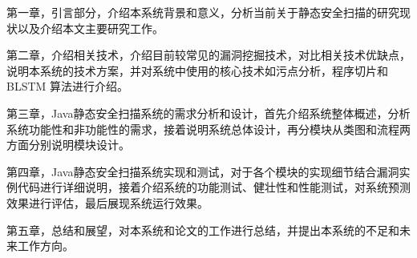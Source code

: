 第一章，引言部分，介绍本系统背景和意义，分析当前关于静态安全扫描的研究现状以及介绍本文主要研究工作。

第二章，介绍相关技术，介绍目前较常见的漏洞挖掘技术，对比相关技术优缺点，说明本系统的技术方案，并对系统中使用的核心技术如污点分析，程序切片和 BLSTM 算法进行介绍。

第三章，Java静态安全扫描系统的需求分析和设计，首先介绍系统整体概述，分析系统功能性和非功能性的需求，接着说明系统总体设计，再分模块从类图和流程两方面分别说明模块设计。

第四章，Java静态安全扫描系统实现和测试，对于各个模块的实现细节结合漏洞实例代码进行详细说明，接着介绍系统的功能测试、健壮性和性能测试，对系统预测效果进行评估，最后展现系统运行效果。

第五章，总结和展望，对本系统和论文的工作进行总结，并提出本系统的不足和未来工作方向。